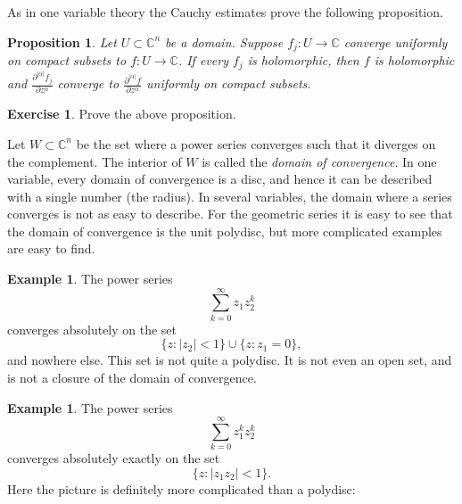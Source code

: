 \documentclass[12pt,openany]{book}
\newcommand{\sabs}[1]{\lvert {#1} \rvert}
\newcommand{\C}{{\mathbb{C}}}
\newcommand{\myindex}[1]{#1\index{#1}}
\theoremstyle{plain}
\newtheorem{prop}[thm]{Proposition}
\theoremstyle{remark}
\theoremstyle{definition}
\newenvironment{exbox}{%
    \def\FrameCommand{\vrule width 1pt \relax\hspace {10pt}}%
    \MakeFramed {\advance \hsize -\width \FrameRestore }%
}{%
    \endMakeFramed
}
\theoremstyle{exercise}
\newtheorem{exercise}{Exercise}[section]
\theoremstyle{example}
\newtheorem{example}[thm]{Example}
\begin{document}
As in one variable theory the Cauchy estimates prove the following
proposition.

\begin{prop}
Let $U \subset \C^n$ be a domain.
Suppose $f_j \colon U \to \C$ converge uniformly on compact subsets
to $f \colon U \to \C$.  If every $f_j$ is holomorphic, then $f$ is
holomorphic and 
$\frac{\partial^{\sabs{\alpha}} f_j}{\partial z^\alpha}$ converge to
$\frac{\partial^{\sabs{\alpha}} f}{\partial z^\alpha}$ uniformly on compact
subsets.
\end{prop}

\begin{exbox}
\begin{exercise}
Prove the above proposition.
\end{exercise}
\end{exbox}

Let $W \subset \C^n$ be the set where a power series converges
such that it diverges on the complement.  The interior of $W$
is called the
\emph{\myindex{domain of convergence}}.
In one variable, every domain of convergence is a disc, and hence it can be
described with a single number (the radius).
In several variables, the domain where a series
converges is not as easy to describe.
For the geometric series it is easy to see
that the domain of convergence is the unit polydisc, but more
complicated examples are easy to find.

\begin{example}
The power series
\begin{equation*}
\sum_{k=0}^\infty z_1 z_2^k
\end{equation*}
converges absolutely on the set
\begin{equation*}
\{ z : \sabs{z_2} < 1 \} \cup \{ z : z_1 = 0 \} ,
\end{equation*}
and nowhere else.
This set is not quite a polydisc.  It is not even an open set, and
is not a closure of the domain of convergence.
\end{example}

\begin{example}
The power series
\begin{equation*}
\sum_{k=0}^\infty z_1^k z_2^k
\end{equation*}
converges absolutely exactly on the set
\begin{equation*}
\{ z : \sabs{z_1 z_2} < 1 \} .
\end{equation*}
Here the picture is definitely more complicated than a polydisc:

\medskip

\begin{center}

\end{center}
\end{example}
\end{document}
